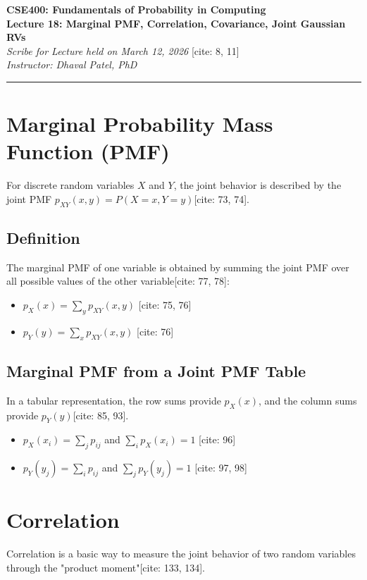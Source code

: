 \documentclass[11pt]{article}
\begin{document}
\begin{center}
    \textbf{\Large CSE400: Fundamentals of Probability in Computing} \\
    \textbf{Lecture 18: Marginal PMF, Correlation, Covariance, Joint Gaussian RVs} \\
    \textit{Scribe for Lecture held on March 12, 2026} [cite: 8, 11] \\
    \textit{Instructor: Dhaval Patel, PhD} 
\end{center}

\hrule
\vspace{0.5cm}

\section{Marginal Probability Mass Function (PMF)}
For discrete random variables $X$ and $Y$, the joint behavior is described by the joint PMF $p_{XY}(x,y) = P(X=x, Y=y)$[cite: 73, 74].

\subsection{Definition}
The marginal PMF of one variable is obtained by summing the joint PMF over all possible values of the other variable[cite: 77, 78]:
\begin{itemize}
    \item $p_{X}(x) = \sum_{y} p_{XY}(x,y)$ [cite: 75, 76]
    \item $p_{Y}(y) = \sum_{x} p_{XY}(x,y)$ [cite: 76]
\end{itemize}

\subsection{Marginal PMF from a Joint PMF Table}
In a tabular representation, the row sums provide $p_{X}(x)$, and the column sums provide $p_{Y}(y)$[cite: 85, 93].
\begin{itemize}
    \item $p_{X}(x_{i}) = \sum_{j} p_{ij}$ and $\sum_{i} p_{X}(x_{i}) = 1$ [cite: 96]
    \item $p_{Y}(y_{j}) = \sum_{i} p_{ij}$ and $\sum_{j} p_{Y}(y_{j}) = 1$ [cite: 97, 98]
\end{itemize}

\section{Correlation}
Correlation is a basic way to measure the joint behavior of two random variables through the "product moment"[cite: 133, 134].
\end{document}
